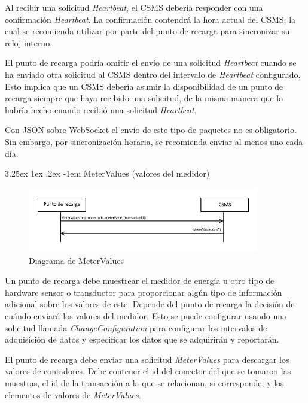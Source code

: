 \documentclass[12pt,a4paper,onecolumn,oneside]{report}
\makeatletter
\renewcommand\paragraph{\@startsection{paragraph}{5}{\z@}%
  {3.25ex \@plus1ex \@minus.2ex}%
  {-1em}%
  {\normalfont\normalsize\bfseries}}
\makeatother
\begin{document}
Al recibir una solicitud \textit{Heartbeat}, el CSMS debería responder con una confirmación \textit{Heartbeat}. La confirmación contendrá la hora actual del CSMS, la cual se recomienda utilizar por parte del punto de recarga para sincronizar su reloj interno.

El punto de recarga podría omitir el envío de una solicitud \textit{Heartbeat} cuando se ha enviado otra solicitud al CSMS dentro del intervalo de \textit{Heartbeat} configurado. Esto implica que un CSMS debería asumir la disponibilidad de un punto de recarga siempre que haya recibido una solicitud, de la misma manera que lo habría hecho cuando recibió una solicitud \textit{Heartbeat}.

Con JSON sobre WebSocket el envío de este tipo de paquetes no es obligatorio. Sin embargo, por sincronización horaria, se recomienda enviar al menos uno cada día.


\paragraph{MeterValues (valores del medidor)}
\label{MeterValues (valores del medidor)}


\begin{figure}[H] 
\centering
  \includegraphics[width=0.9\textwidth]{figuras/diagramametervalues.png}
  \caption[Diagrama de \textit{MeterValues}]{Diagrama de MeterValues\\
  }
  \label{fig:diagramametervalues}
\end{figure}


Un punto de recarga debe muestrear el medidor de energía u otro tipo de hardware sensor o transductor para proporcionar algún tipo de información adicional sobre los valores de este. Depende del punto de recarga la decisión de cuándo enviará los valores del medidor. Esto se puede configurar usando una solicitud llamada \textit{ChangeConfiguration} para configurar los intervalos de adquisición de datos y especificar los datos que se adquirirán y reportarán.

El punto de recarga debe enviar una solicitud \textit{MeterValues} para descargar los valores de contadores. Debe contener el id del conector del que se tomaron las muestras, el id de la transacción a la que se relacionan, si corresponde, y los elementos de valores de \textit{MeterValues}.
\end{document}
